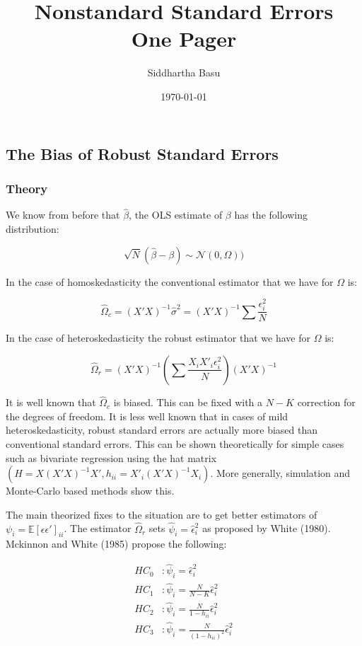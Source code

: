 \documentclass[12 pt, leqno]{article}
\begin{document}
\title{Nonstandard Standard Errors \\ One Pager}
\author{Siddhartha Basu}
\date{\today}
\maketitle

\subsection*{The Bias of Robust Standard Errors}

\subsubsection*{Theory}

We know from before that $\hat{\beta}$, the OLS estimate of $\beta$ has the following distribution:

$$\sqrt{N} (\hat{\beta} - \beta) \sim \mathcal{N}(0, \Omega)) $$

In the case of homoskedasticity the conventional estimator that we have for $\Omega$ is:

$$\hat{\Omega}_c = (X'X)^{-1} \hat{\sigma}^2 = (X'X)^{-1} \sum \frac{\epsilon_i^2}{N} $$

In the case of heteroskedasticity the robust estimator that we have for $\Omega$ is:

$$\hat{\Omega}_r = (X'X)^{-1} \left( \sum \frac{X_i X'_i \epsilon_i^2}{N} \right) (X'X)^{-1}$$

It is well known that $\hat{\Omega}_c$ is biased. This can be fixed with a $N-K$ correction for the degrees of freedom. It is less well known that in cases of mild heteroskedasticity, robust standard errors are actually more biased than conventional standard errors.  This can be shown theoretically for simple cases such as bivariate regression using the hat matrix $(H = X(X'X)^{-1} X', h_{ii} = X'_i (X'X)^{-1} X_i)$. More generally, simulation and Monte-Carlo based methods show this. 

The main theorized fixes to the situation are to get better estimators of $\psi_i = \mathbb{E}[\epsilon \epsilon']_{ii}$. The estimator $\hat{\Omega}_r$ sets $\hat{\psi}_i = \hat{\epsilon}_i^2$ as proposed by White (1980). Mckinnon and White (1985) propose the following:

\begin{align*}
HC_0 &: \hat{\psi}_i = \hat{\epsilon}_i^2 \\ 
HC_1 &: \hat{\psi}_i = \frac{N}{N-K} \hat{\epsilon}_i^2 \\ 
HC_2 &: \hat{\psi}_i = \frac{N}{1 - h_{ii}} \hat{\epsilon}_i^2 \\ 
HC_3 &: \hat{\psi}_i = \frac{N}{(1 - h_{ii})^2} \hat{\epsilon}_i^2
\end{align*}
\end{document}
